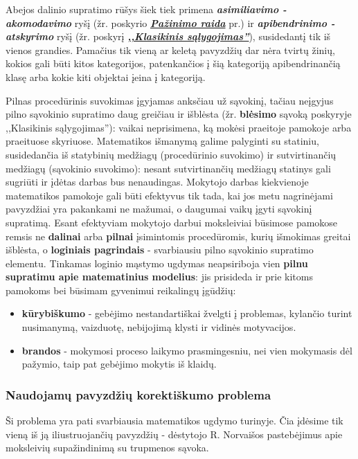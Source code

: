 \documentclass{article}
\begin{document}
Abejos dalinio supratimo rūšys šiek tiek primena \textbf{\textit{asimiliavimo - akomodavimo}} ryšį (žr. poskyrio \hyperlink{pazinimoraida}{\textbf{\textit{Pažinimo raida}}} pr.) ir \textbf{\textit{apibendrinimo - atskyrimo}} ryšį (žr. poskyrį \hyperlink{klasikinis}{\textbf{\textit{,,Klasikinis sąlygojimas''}}}), susidedantį tik iš vienos grandies. Pamačius tik vieną ar keletą pavyzdžių dar nėra tvirtų žinių, kokios gali būti kitos kategorijos, patenkančios į šią kategoriją apibendrinančią klasę arba kokie kiti objektai įeina į kategoriją. 

Pilnas procedūrinis suvokimas įgyjamas anksčiau už sąvokinį, tačiau neįgyjus pilno sąvokinio supratimo daug greičiau ir išblėsta (žr. \textbf{blėsimo} sąvoką poskyryje ,,Klasikinis sąlygojimas''): vaikai neprisimena, ką mokėsi praeitoje pamokoje arba praeituose skyriuose. Matematikos išmanymą galime palyginti su statiniu, susidedančia iš statybinių medžiagų (procedūrinio suvokimo) ir sutvirtinančių medžiagų (sąvokinio suvokimo): nesant sutvirtinančių medžiagų statinys gali sugriūti ir įdėtas darbas bus nenaudingas. Mokytojo darbas kiekvienoje matematikos pamokoje gali būti efektyvus tik tada, kai jos metu nagrinėjami pavyzdžiai yra pakankami ne mažumai, o daugumai vaikų įgyti sąvokinį supratimą. Esant efektyviam mokytojo darbui moksleiviai būsimose pamokose remsis ne \textbf{dalinai} arba \textbf{pilnai} įsimintomis procedūromis, kurių išmokimas greitai išblėsta, o \textbf{loginiais pagrindais} - svarbiausiu pilno sąvokinio supratimo elementu. Tinkamas loginio mąstymo ugdymas neapsiriboja vien \textbf{pilnu supratimu apie matematinius modelius}: jis prisideda ir prie kitoms pamokoms bei būsimam gyvenimui reikalingų įgūdžių: 
\begin{itemize}
\item \textbf{kūrybiškumo} - gebėjimo nestandartiškai žvelgti į problemas, kylančio turint nusimanymą, vaizduotę, nebijojimą klysti ir vidinės motyvacijos.
\item \textbf{brandos} - mokymosi proceso laikymo prasmingesniu, nei vien mokymasis dėl pažymio, taip pat gebėjimo mokytis iš klaidų.
\end{itemize}

\subsubsection{Naudojamų pavyzdžių korektiškumo problema} 

Ši problema yra pati svarbiausia matematikos ugdymo turinyje. Čia įdėsime tik vieną iš ją iliustruojančių pavyzdžių - dėstytojo R. Norvaišos pastebėjimus apie moksleivių supažindinimą su trupmenos sąvoka. 
\end{document}
